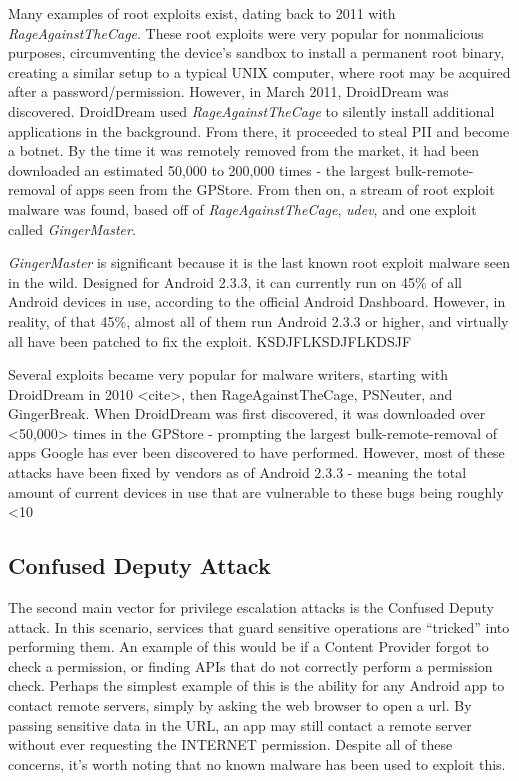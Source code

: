 Many examples of root exploits exist, dating back to 2011 with \textit{RageAgainstTheCage}\citep{droiddream}. These root exploits were very popular for nonmalicious purposes, circumventing the device's sandbox to install a permanent root binary, creating a similar setup to a typical UNIX computer, where root may be acquired after a password/permission. However, in March 2011, DroidDream was discovered. DroidDream used \textit{RageAgainstTheCage} to silently install additional applications in the background. From there, it proceeded to steal PII and become a botnet. By the time it was remotely removed from the market, it had been downloaded an estimated 50,000 to 200,000 times\citep{castillo2010android} - the largest bulk-remote-removal of apps seen from the GPStore. From then on, a stream of root exploit malware was found, based off of \textit{RageAgainstTheCage}, \textit{udev}, and one exploit called \textit{GingerMaster}\citep{gingermaster}.

\textit{GingerMaster} is significant because it is the last known root exploit malware seen in the wild. Designed for Android 2.3.3, it can currently run on 45\% of all Android devices in use, according to the official Android Dashboard\citep{androiddashboard}. However, in reality, of that 45\%, almost all of them run Android 2.3.3 or higher, and virtually all have been patched to fix the exploit. KSDJFLKSDJFLKDSJF

 Several exploits became very popular for malware writers, starting with DroidDream in 2010 <cite>, then RageAgainstTheCage, PSNeuter, and GingerBreak. When DroidDream was first discovered, it was downloaded over <50,000> times in the GPStore - prompting the largest bulk-remote-removal of apps Google has ever been discovered to have performed. However, most of these attacks have been fixed by vendors as of Android 2.3.3 - meaning the total amount of current devices in use that are vulnerable to these bugs being roughly <10%

\subsection{Confused Deputy Attack}
The second main vector for privilege escalation attacks is the Confused Deputy attack. In this scenario, services that guard sensitive operations are ``tricked'' into performing them. An example of this would be if a Content Provider forgot to check a permission, or finding APIs that do not correctly perform a permission check. Perhaps the simplest example of this is the ability for any Android app to contact remote servers, simply by asking the web browser to open a url. By passing sensitive data in the URL, an app may still contact a remote server without ever requesting the INTERNET permission. Despite all of these concerns, it’s worth noting that no known malware has been used to exploit this. 

